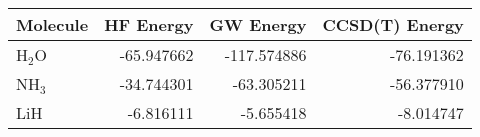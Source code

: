 \begin{tabular}{lrrr}
\toprule
Molecule & HF Energy & GW Energy & CCSD(T) Energy \\
\midrule
H$_2$O & -65.947662 & -117.574886 & -76.191362 \\
NH$_3$ & -34.744301 & -63.305211 & -56.377910 \\
LiH & -6.816111 & -5.655418 & -8.014747 \\
\bottomrule
\end{tabular}
